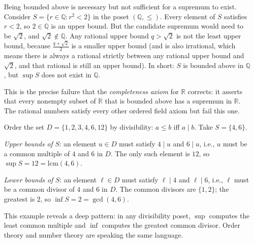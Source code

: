
\begin{remark*}[Exposition]
Being bounded above is necessary but not sufficient for a supremum to exist.
Consider $S = \{r \in \mathbb{Q} : r^2 < 2\}$ in the poset $(\mathbb{Q},\leq)$.
Every element of $S$ satisfies $r < 2$, so $2 \in \mathbb{Q}$ is an upper
bound.  But the candidate supremum would need to be $\sqrt{2}$, and
$\sqrt{2} \notin \mathbb{Q}$.  Any rational upper bound $q > \sqrt{2}$ is not
the least upper bound, because $\frac{q + \sqrt{2}}{2}$ is a smaller upper
bound (and is also irrational, which means there is always a rational
strictly between any rational upper bound and $\sqrt{2}$, and that rational is
still an upper bound).  In short: $S$ is bounded above in $\mathbb{Q}$, but
$\sup S$ does not exist in $\mathbb{Q}$.

This is the precise failure that the \emph{completeness axiom} for
$\mathbb{R}$ corrects: it asserts that every nonempty subset of $\mathbb{R}$
that is bounded above has a supremum in $\mathbb{R}$.  The rational numbers
satisfy every other ordered field axiom but fail this one.
\end{remark*}


\begin{remark*}[Exposition]
Order the set $D = \{1,2,3,4,6,12\}$ by divisibility: $a \leq b$ iff $a \mid b$.
Take $S = \{4, 6\}$.

\emph{Upper bounds of $S$}: an element $u \in D$ must satisfy $4 \mid u$ and
$6 \mid u$, i.e., $u$ must be a common multiple of $4$ and $6$ in $D$.
The only such element is $12$, so $\sup S = 12 = \mathrm{lcm}(4,6)$.

\emph{Lower bounds of $S$}: an element $\ell \in D$ must satisfy $\ell \mid 4$
and $\ell \mid 6$, i.e., $\ell$ must be a common divisor of $4$ and $6$ in $D$.
The common divisors are $\{1,2\}$; the greatest is $2$, so $\inf S = 2 =
\gcd(4,6)$.

This example reveals a deep pattern: in any divisibility poset, $\sup$ computes
the least common multiple and $\inf$ computes the greatest common divisor.
Order theory and number theory are speaking the same language.
\end{remark*}

